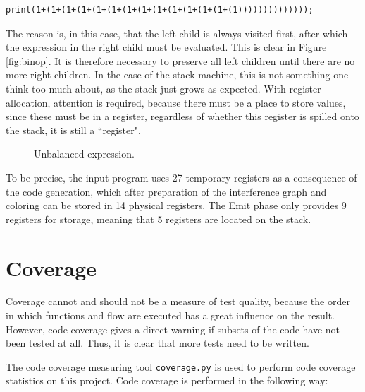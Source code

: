 \begin{verbatim}
print(1+(1+(1+(1+(1+(1+(1+(1+(1+(1+(1+(1+(1+(1))))))))))))));
\end{verbatim}

The reason is, in this case, that the left child is always visited first, after which the expression in the right child must be evaluated. This is clear in Figure \ref{fig:binop}. It is therefore necessary to preserve all left children until there are no more right children. In the case of the stack machine, this is not something one think too much about, as the stack just grows as expected. With register allocation, attention is required, because there must be a place to store values, since these must be in a register, regardless of whether this register is spilled onto the stack, it is still a ``register".

\begin{figure}[H]
    \centering
    
    \caption{Unbalanced expression.} 
    \label{fig:unbalanced_tree}
\end{figure}

To be precise, the input program uses 27 temporary registers as a consequence of the code generation, which after preparation of the interference graph and coloring can be stored in 14 physical registers. The Emit phase only provides 9 registers for storage, meaning that 5 registers are located on the stack.


\section{Coverage}
Coverage cannot and should not be a measure of test quality, because the order in which functions and flow are executed has a great influence on the result. However, code coverage gives a direct warning if subsets of the code have not been tested at all. Thus, it is clear that more tests need to be written.

The code coverage measuring tool \texttt{coverage.py} is used to perform code coverage statistics on this project. Code coverage is performed in the following way:

